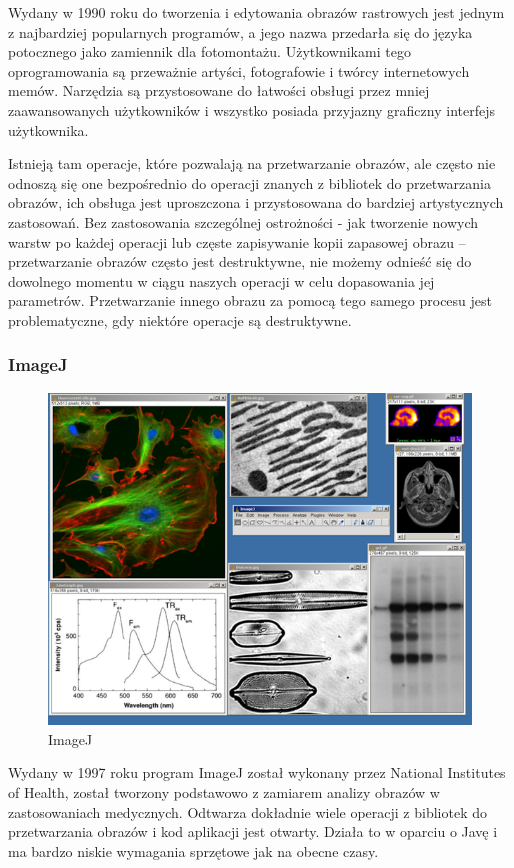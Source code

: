Wydany w 1990 roku do tworzenia i edytowania obrazów rastrowych jest jednym z najbardziej popularnych programów, a jego nazwa przedarła się do języka potocznego jako zamiennik dla fotomontażu. 
Użytkownikami tego oprogramowania są przeważnie artyści, fotografowie i twórcy internetowych memów. 
Narzędzia są przystosowane do łatwości obsługi przez mniej zaawansowanych użytkowników i wszystko posiada przyjazny graficzny interfejs użytkownika. 

Istnieją tam operacje, które pozwalają na przetwarzanie obrazów, ale często nie odnoszą się one bezpośrednio do operacji znanych z bibliotek do przetwarzania obrazów, ich obsługa jest uproszczona i przystosowana do bardziej artystycznych zastosowań. 
Bez zastosowania szczególnej ostrożności - jak tworzenie nowych warstw po każdej operacji lub częste zapisywanie kopii zapasowej obrazu – przetwarzanie obrazów często jest destruktywne, nie możemy odnieść się do dowolnego momentu w ciągu naszych operacji w celu dopasowania jej parametrów. 
Przetwarzanie innego obrazu za pomocą tego samego procesu jest problematyczne, gdy niektóre operacje są destruktywne.

\subsubsection{ImageJ}
\begin{figure}[H]
    \centering
    \includegraphics[width=0.8\linewidth]{./images/Picture3.png}
    \caption{ImageJ}
    \label{fig:imagej}
\end{figure}
Wydany w 1997 roku program ImageJ został wykonany przez National Institutes of Health, został tworzony podstawowo z zamiarem analizy obrazów w zastosowaniach medycznych. 
Odtwarza dokładnie wiele operacji z bibliotek do przetwarzania obrazów i kod aplikacji jest otwarty. 
Działa to w oparciu o Javę i ma bardzo niskie wymagania sprzętowe jak na obecne czasy.

